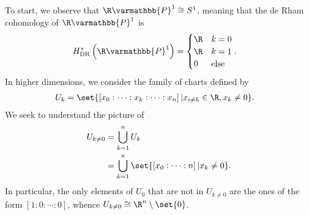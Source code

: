 \documentclass[10pt]{mypackage}
\renewcommand*{\mathbb}[1]{\varmathbb{#1}}
\begin{document}
\begin{solution}
  To start, we observe that $\R\mathbb{P}^{1}\cong S^{1}$, meaning that the de Rham cohomology of $\R\mathbb{P}^{1}$ is
  \begin{align*}
    H^{\ast}_{\operatorname{DR}}\left( \R\mathbb{P}^{1} \right) &= \begin{cases}
      \R & k = 0\\
      \R & k = 1\\
      0 & \text{else}
    \end{cases}.
  \end{align*}
  In higher dimensions, we consider the family of charts defined by
  \begin{align*}
    U_k &= \set{\left[ x_0:\cdots : x_{k} : \cdots : x_{n} \right] | x_{i\neq k}\in\R, x_k\neq 0}.
  \end{align*}
  We seek to understand the picture of
  \begin{align*}
    U_{k\neq 0} &= \bigcup_{k=1}^{n} U_k\\
                &= \bigcup_{k=1}^{n}\set{\left[ x_0 : \cdots : n \right] | x_k\neq 0}.
  \end{align*}
  In particular, the only elements of $U_0$ that are not in $U_{k\neq 0}$ are the ones of the form $\left[ 1:0:\cdots:0 \right]$, whence $U_{k\neq 0}\cong \R^{n}\setminus \set{0}$.\newline


\end{solution}
\end{document}
